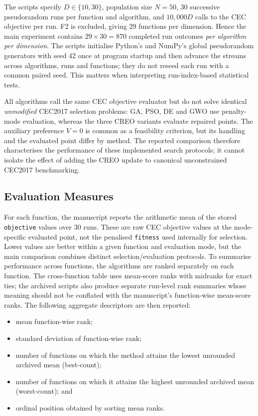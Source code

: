 \documentclass[a4paper,fleqn]{cas-sc}
\begin{document}
The scripts specify $D\in\{10,30\}$, population size $N=50$, 30 successive pseudorandom runs per function and algorithm, and $10{,}000D$ calls to the CEC objective per run. F2 is excluded, giving 29 functions per dimension. Hence the main experiment contains $29\times30=870$ completed run outcomes \emph{per algorithm per dimension}. The scripts initialise Python's and NumPy's global pseudorandom generators with seed 42 once at program startup and then advance the streams across algorithms, runs and functions; they do not reseed each run with a common paired seed. This matters when interpreting run-index-based statistical tests.

All algorithms call the same CEC objective evaluator but do not solve identical \emph{unmodified} CEC2017 selection problems: GA, PSO, DE and GWO use penalty-mode evaluation, whereas the three CREO variants evaluate repaired points. The auxiliary preference $V=0$ is common as a feasibility criterion, but its handling and the evaluated point differ by method. The reported comparison therefore characterises the performance of these implemented search protocols; it cannot isolate the effect of adding the CREO update to canonical unconstrained CEC2017 benchmarking.

\subsection{Evaluation Measures}

For each function, the manuscript reports the arithmetic mean of the stored \texttt{objective} values over 30 runs. These are raw CEC objective values at the mode-specific evaluated point, not the penalised \texttt{fitness} used internally for selection. Lower values are better within a given function and evaluation mode, but the main comparison combines distinct selection/evaluation protocols. To summarise performance across functions, the algorithms are ranked separately on each function. The cross-function table uses mean-score ranks with midranks for exact ties; the archived scripts also produce separate run-level rank summaries whose meaning should not be conflated with the manuscript's function-wise mean-score ranks. The following aggregate descriptors are then reported:
\begin{itemize}
    \item mean function-wise rank;
    \item standard deviation of function-wise rank;
    \item number of functions on which the method attains the lowest unrounded archived mean (best-count);
    \item number of functions on which it attains the highest unrounded archived mean (worst-count); and
    \item ordinal position obtained by sorting mean ranks.
\end{itemize}
\end{document}

